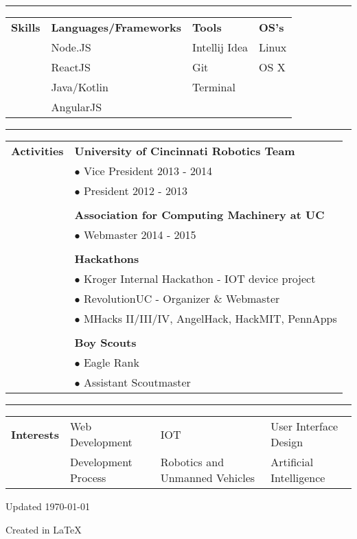\documentclass[11pt]{article} %
\begin{document}
\begin{small}
\begin{tabular}[t]{p{3cm} p{16cm}}
			\end{tabular}
			\vspace*{.75\baselineskip}\hrule\vspace*{1\baselineskip}
			\begin{tabular}[t]{p{3cm}p{4cm}p{5cm}p{4cm}}\large{\textbf{Skills}} 	
				& \textbf{Languages/Frameworks}	& \textbf{Tools}& \textbf{OS's} 			\\ 
				& Node.JS				& Intellij Idea 		    & Linux 			\\
				& ReactJS				& Git					& OS X	  		\\
				& Java/Kotlin			& Terminal				&	 	\\
				& AngularJS				& 					 	& 				\\
				
			\end{tabular}
			\vspace*{.75\baselineskip}\hrule\vspace*{1\baselineskip}		
			\begin{tabular}[t]{p{3cm} p{16cm}}\large{\textbf{Activities}}
					& \textbf{University of Cincinnati Robotics Team}			\\
					& $\bullet$ Vice President 2013 - 2014					\\
					& $\bullet$ President 2012 - 2013						\\
					& \\
					& \textbf{Association for Computing Machinery at UC}		\\
					& $\bullet$ Webmaster 2014 - 2015 						\\
					& \\
					& \textbf{Hackathons} 								\\
					& $\bullet$ Kroger Internal Hackathon - IOT device project		\\ 
					& $\bullet$ RevolutionUC - Organizer \& Webmaster 			\\
					& $\bullet$ MHacks II/III/IV, AngelHack, HackMIT, PennApps 	\\
					& \\
					& \textbf{Boy Scouts} 								\\
					& $\bullet$ Eagle Rank								\\
					& $\bullet$ Assistant Scoutmaster						\\	
			\end{tabular}
			\vspace*{.75\baselineskip}\hrule\vspace*{1\baselineskip}
			\begin{tabular}[t]{p{3cm} p{4cm}p{5cm}p{5cm}}\large{\textbf{Interests}}
				& Web Development		& IOT	& User Interface Design 	\\
				& Development Process    & Robotics and Unmanned Vehicles					& Artificial Intelligence 	\\
			\end{tabular}

			\vspace*{2\baselineskip}
			\centerline{\scriptsize{Updated \today}}
			\centerline{\scriptsize{Created in \LaTeX}}
		\end{small}
\end{document}
